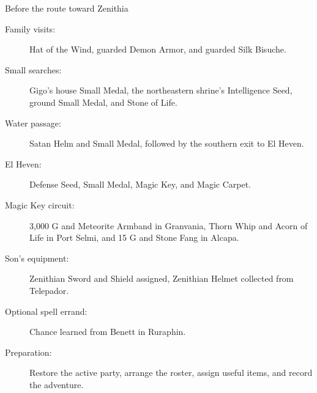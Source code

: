 \begin{routecheck}[breakable=false]{Before the route toward Zenithia}
\begin{description}
  \item[Family visits:] Hat of the Wind, guarded Demon Armor,
    and guarded Silk Bisuche.
  \item[Small searches:] Gigo's house Small Medal, the northeastern
    shrine's Intelligence Seed, ground Small Medal, and Stone of Life.
  \item[Water passage:] Satan Helm and Small Medal, followed by
    the southern exit to El Heven.
  \item[El Heven:] Defense Seed, Small Medal, Magic Key, and Magic Carpet.
  \item[Magic Key circuit:] 3,000 G and Meteorite Armband in Granvania,
    Thorn Whip and Acorn of Life in Port Selmi, and 15 G and Stone
    Fang in Alcapa.
  \item[Son's equipment:] Zenithian Sword and Shield assigned,
    Zenithian Helmet collected from Telepador.
  \item[Optional spell errand:] Chance learned from Benett in Ruraphin.
  \item[Preparation:] Restore the active party, arrange the roster,
    assign useful items, and record the adventure.
\end{description}
\end{routecheck}

